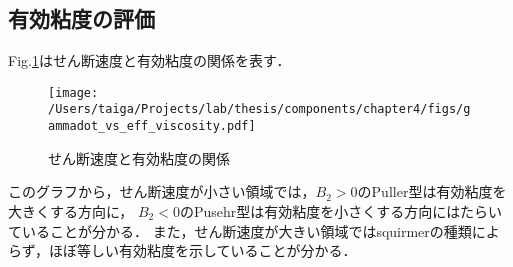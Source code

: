 \subsection{有効粘度の評価}
Fig.\ref{fig:estimate_eff_viscocity}はせん断速度と有効粘度の関係を表す．

    \begin{figure}[htbp]
        \centering
        \texttt{[image: /Users/taiga/Projects/lab/thesis/components/chapter4/figs/gammadot\_vs\_eff\_viscosity.pdf]}
        \caption{せん断速度と有効粘度の関係}
        \label{fig:estimate_eff_viscocity}
    \end{figure}

\noindent
このグラフから，せん断速度が小さい領域では，$B_2 > 0$のPuller型は有効粘度を大きくする方向に，
$B_2 < 0$のPusehr型は有効粘度を小さくする方向にはたらいていることが分かる．
また，せん断速度が大きい領域ではsquirmerの種類によらず，ほぼ等しい有効粘度を示していることが分かる．
